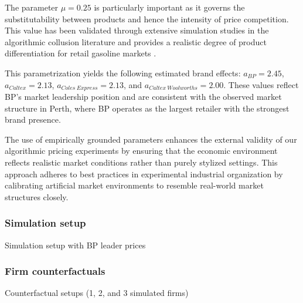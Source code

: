 The parameter $\mu = 0.25$ is particularly important as it governs the substitutability between products and hence the intensity of price competition. This value has been validated through extensive simulation studies in the algorithmic collusion literature and provides a realistic degree of product differentiation for retail gasoline markets \parencite{calvano_artificial_2020}.

This parametrization yields the following estimated brand effects: $a_{BP} = 2.45$, $a_{Caltex} = 2.13$, $a_{Coles\ Express} = 2.13$, and $a_{Caltex\ Woolworths} = 2.00$. These values reflect BP's market leadership position and are consistent with the observed market structure in Perth, where BP operates as the largest retailer with the strongest brand presence.

The use of empirically grounded parameters enhances the external validity of our algorithmic pricing experiments by ensuring that the economic environment reflects realistic market conditions rather than purely stylized settings. This approach adheres to best practices in experimental industrial organization by calibrating artificial market environments to resemble real-world market structures closely.

\subsubsection*{Simulation setup}
Simulation setup with BP leader prices

\subsubsection*{Firm counterfactuals}
Counterfactual setups (1, 2, and 3 simulated firms)